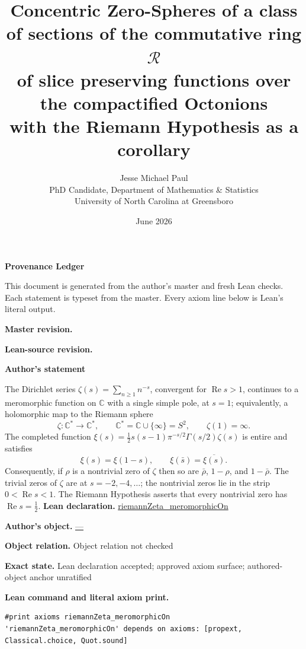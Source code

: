 \documentclass[11pt]{article}
\title{Concentric Zero-Spheres of a class of sections of the commutative ring $\mathcal R$\\ of slice preserving functions
over the compactified Octonions\\[0.4em]
\large
with the Riemann Hypothesis as a corollary}
\author{Jesse Michael Paul\\[2pt]
{\normalsize PhD Candidate, Department of Mathematics \& Statistics}\\
{\normalsize University of North Carolina at Greensboro}}
\date{June 2026}
\newcommand{\CC}{\mathbb{C}}
\newcommand{\Cstar}{\CC^{*}}
\DeclareMathOperator{\re}{Re}
\theoremstyle{plain}
\theoremstyle{definition}
\theoremstyle{remark}
\begin{document}
{\LARGE\bfseries Provenance Ledger}\par
\vspace{2mm}{\large Concentricity}\par\medskip
This document is generated from the author's master and fresh Lean checks. Each statement is typeset from the master. Every axiom line below is Lean's literal output.
\par\medskip\textbf{Master revision.} {\ttfamily\small{}}
\par\textbf{Lean-source revision.} {\ttfamily\small{}}
\bigskip
\begin{tcolorbox}[provenancecard,title={1. Theorem - Meromorphic continuation and functional equation; Riemann \textbackslash{}cite\{Riemann1859\}},title after break={1. Theorem - Meromorphic continuation and functional equation; Riemann \textbackslash{}cite\{Riemann1859\} (continued)}]
\textbf{Author's statement}\par
The Dirichlet series $\zeta(s)=\sum_{n\ge1}n^{-s}$, convergent for $\re s>1$, continues to a
meromorphic function on $\CC$ with a single simple pole, at $s=1$; equivalently, a holomorphic map
to the Riemann sphere
\[
  \zeta:\Cstar\longrightarrow\Cstar,\qquad \Cstar=\CC\cup\{\infty\}=S^2,\qquad \zeta(1)=\infty .
\]
The completed function $\xi(s)=\tfrac12 s(s-1)\pi^{-s/2}\Gamma(s/2)\zeta(s)$ is entire and satisfies
\[
  \xi(s)=\xi(1-s),\qquad \xi(\bar s)=\overline{\xi(s)} .
\]
Consequently, if $\rho$ is a nontrivial zero of $\zeta$ then so are $\bar\rho$, $1-\rho$, and
$1-\bar\rho$. The trivial zeros of $\zeta$ are at $s=-2,-4,\dots$; the nontrivial zeros lie in the
strip $0<\re s<1$. The Riemann Hypothesis asserts that every nontrivial zero has $\re s=\tfrac12$.
\tcblower
\textbf{Lean declaration.} \url{riemannZeta_meromorphicOn}
\par\textbf{Author's object.} \url{—}
\par\textbf{Object relation.} Object relation not checked
\par\textbf{Exact state.} Lean declaration accepted; approved axiom surface; authored-object anchor unratified
\par\smallskip\textbf{Lean command and literal axiom print.}
\begin{Verbatim}[breaklines=true,breakanywhere=true,fontsize=\small]
#print axioms riemannZeta_meromorphicOn
'riemannZeta_meromorphicOn' depends on axioms: [propext, Classical.choice, Quot.sound]

\end{Verbatim}
\end{tcolorbox}
\end{document}
